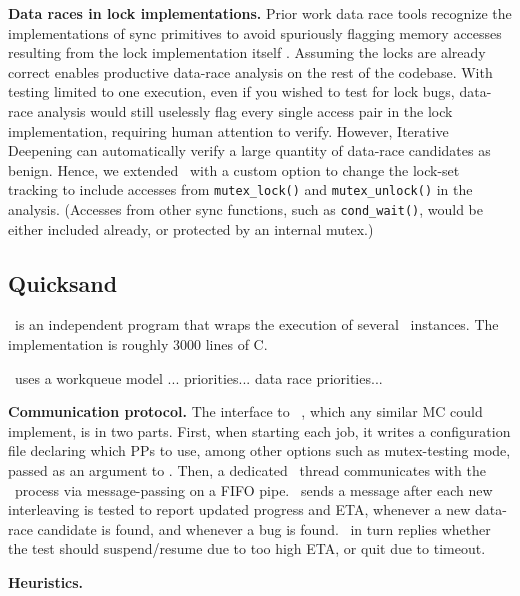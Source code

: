 {\bf Data races in lock implementations.}
Prior work data race tools recognize the implementations of sync primitives to avoid spuriously flagging memory accesses resulting from the lock implementation itself \cite{tsan}.
Assuming the locks are already correct enables productive data-race analysis on the rest of the codebase.
With testing limited to one execution, even if you wished to test for lock bugs, data-race analysis would still uselessly flag every single access pair in the lock implementation, requiring human attention to verify.
However, Iterative Deepening can automatically verify a large quantity of data-race candidates as benign.
Hence, we extended \landslide~with a custom option to change the lock-set tracking to include accesses from {\tt mutex\_lock()} and {\tt mutex\_unlock()} in the analysis. (Accesses from other sync functions, such as {\tt cond\_wait()}, would be either included already, or protected by an internal mutex.)

\subsection{Quicksand} %

\quicksand~is an independent program that wraps the execution of several \landslide~instances.
The implementation is roughly 3000 lines of C.



\quicksand~uses a workqueue model
...
priorities... data race priorities...

{\bf Communication protocol.}
The interface to \landslide~, which any similar MC could implement, is in two parts.
First, when starting each job, it writes a configuration file declaring which PPs to use,
among other options such as mutex-testing mode,
passed as an argument to \landslide.
Then, a dedicated \quicksand~thread communicates with the \landslide~process via message-passing on a FIFO pipe.
\landslide~sends a message after each new interleaving is tested to report updated progress and ETA,
whenever a new data-race candidate is found, and whenever a bug is found.
\quicksand~in turn replies whether the test should suspend/resume due to too high ETA, or quit due to timeout.

{\bf Heuristics.}


